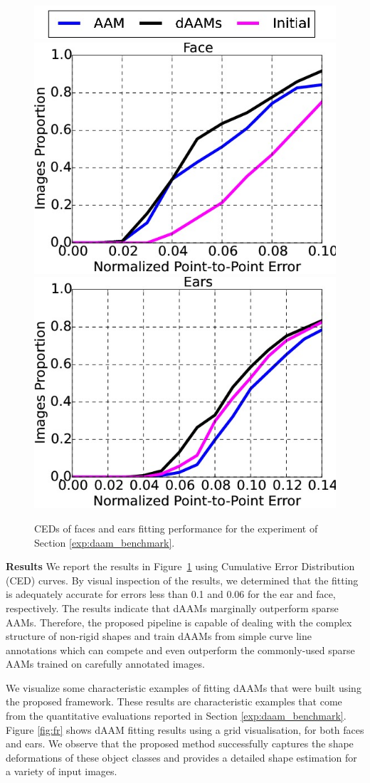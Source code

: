 \begin{figure}
    \centering
    \includegraphics[width=0.6\columnwidth]{resources/Annotation_Correction/DAAMBenchmark/legend}
    \\
    \includegraphics[width=0.48\columnwidth]{resources/Annotation_Correction/DAAMBenchmark/face}
    \includegraphics[width=0.48\columnwidth]{resources/Annotation_Correction/DAAMBenchmark/ear}
    \caption{CEDs of faces and ears fitting performance for the experiment of Section \ref{exp:daam_benchmark}.}
    \label{fig:daam_benchmark}
\end{figure}

\noindent\textbf{Results} We report the results in Figure~\ref{fig:daam_benchmark} using Cumulative Error Distribution (CED) curves. By visual inspection of the results, we determined that the fitting is adequately accurate for errors less than 0.1 and 0.06 for the ear and face, respectively. The results indicate that dAAMs marginally outperform sparse AAMs. Therefore, the proposed pipeline is capable of dealing with the complex structure of non-rigid shapes and train dAAMs from simple curve line annotations which can compete and even outperform the commonly-used sparse AAMs trained on carefully annotated images.

We visualize some characteristic examples of fitting dAAMs that were built using the proposed framework. These results are characteristic examples that come from the quantitative evaluations reported in Section \ref{exp:daam_benchmark}. Figure \ref{fig:fr} shows dAAM fitting results using a grid visualisation, for both faces and ears. We observe that the proposed method successfully captures the shape deformations of these object classes and provides a detailed shape estimation for a variety of input images.

